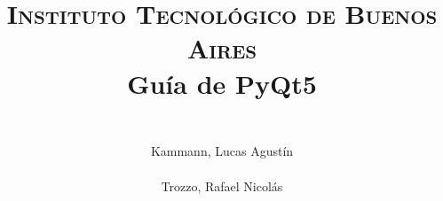 


    
	\title{
		\normalfont \normalsize \textsc{Instituto Tecnol\'ogico de Buenos Aires} \\ [25pt]
		\huge Guía de PyQt5 \\
		\author{
			\\Kammann, Lucas Agust\'in \\
			\\Trozzo, Rafael Nicol\'as \\
		}
	}
	\maketitle
	\newpage

	\tableofcontents

	\newpage
	
	\newpage
	
	\newpage
	
